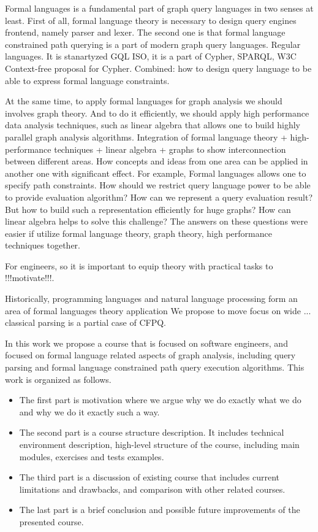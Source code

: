 \documentclass[sigconf]{acmart}
\begin{document}
Formal languages is a fundamental part of graph query languages in two senses at least.
First of all, formal language theory is necessary to design query engines frontend, namely parser and lexer.
The second one is that formal language constrained path querying is a part of modern graph query languages. 
Regular languages. It is stanartyzed GQL ISO, it is a part of Cypher, SPARQL, W3C 
Context-free proposal for Cypher.
Combined: how to design query language to be able to express formal language constraints.

At the same time, to apply formal languages for graph analysis we should involves graph theory.
And to do it efficiently, we should apply high performance data analysis techniques, such as linear algebra that allows one to build highly parallel graph analysis algorithms.
Integration of formal language theory + high-performance techniques + linear algebra + graphs to show interconnection between different areas.
How concepts and ideas from one area can be applied in another one with significant effect. 
For example, Formal languages allows one to specify path constraints.
How should we restrict query language power to be able to provide evaluation algorithm?
How can we represent a query evaluation result?
But how to build such a representation efficiently for huge graphs?
How can linear algebra helps to solve this challenge?
The answers on these questions were easier if utilize formal language theory, graph theory, high performance techniques together.

For engineers, so it is important to equip theory with practical tasks to !!!motivate!!!. 

Historically, programming languages and natural language processing form an area of formal languages theory application
We propose to move focus on wide ... classical parsing is a partial case of CFPQ. 

In this work we propose a course that is focused on software engineers, and focused on formal language related aspects of graph analysis, including query parsing and formal language constrained path query execution algorithms.
This work is organized as follows.
\begin{itemize}
  \item The first part is motivation where we argue why we do exactly what we do and why we do it exactly such a way. 
  \item The second part is a course structure description. It includes technical environment description, high-level structure of the course, including main modules, exercises and tests examples.
  \item The third part is a discussion of existing course that includes current limitations and drawbacks, and comparison with other related courses.
  \item The last part is a brief conclusion and possible future improvements of the presented course.
\end{itemize}  
\end{document}
